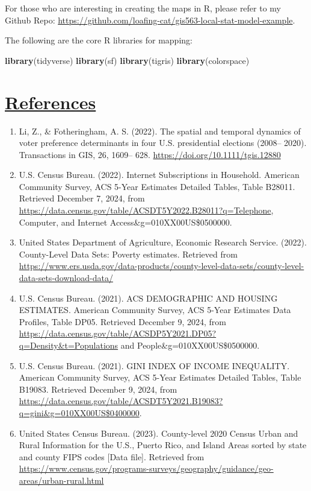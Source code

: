 \documentclass[
]{article}
\newenvironment{Shaded}{\begin{snugshade}}{\end{snugshade}}
\newcommand{\FunctionTok}[1]{\textcolor[rgb]{0.13,0.29,0.53}{\textbf{#1}}}
\newcommand{\NormalTok}[1]{#1}
\begin{document}
For those who are interesting in creating the maps in R, please refer to
my Github Repo:
\url{https://github.com/loafing-cat/gis563-local-stat-model-example}.

The following are the core R libraries for mapping:

\begin{Shaded}
\begin{Highlighting}[]
\FunctionTok{library}\NormalTok{(tidyverse)}
\FunctionTok{library}\NormalTok{(sf)}
\FunctionTok{library}\NormalTok{(tigris)}
\FunctionTok{library}\NormalTok{(colorspace)}
\end{Highlighting}
\end{Shaded}

\newpage

\section{\texorpdfstring{\ul{References}}{References}}\label{references}

\begin{enumerate}
\def\labelenumi{\arabic{enumi}.}
\item
  Li, Z., \& Fotheringham, A. S. (2022). The spatial and temporal
  dynamics of voter preference determinants in four U.S. presidential
  elections (2008-- 2020). Transactions in GIS, 26, 1609-- 628.
  \url{https://doi.org/10.1111/tgis.12880}
\item
  U.S. Census Bureau. (2022). Internet Subscriptions in Household.
  American Community Survey, ACS 5-Year Estimates Detailed Tables, Table
  B28011. Retrieved December 7, 2024, from
  \url{https://data.census.gov/table/ACSDT5Y2022.B28011?q=Telephone},
  Computer, and Internet Access\&g=010XX00US\$0500000.
\item
  United States Department of Agriculture, Economic Research Service.
  (2022). County-Level Data Sets: Poverty estimates. Retrieved from
  \url{https://www.ers.usda.gov/data-products/county-level-data-sets/county-level-data-sets-download-data/}
\item
  U.S. Census Bureau. (2021). ACS DEMOGRAPHIC AND HOUSING ESTIMATES.
  American Community Survey, ACS 5-Year Estimates Data Profiles, Table
  DP05. Retrieved December 9, 2024, from
  \url{https://data.census.gov/table/ACSDP5Y2021.DP05?q=Density&t=Populations}
  and People\&g=010XX00US\$0500000.
\item
  U.S. Census Bureau. (2021). GINI INDEX OF INCOME INEQUALITY. American
  Community Survey, ACS 5-Year Estimates Detailed Tables, Table B19083.
  Retrieved December 9, 2024, from
  \url{https://data.census.gov/table/ACSDT5Y2021.B19083?q=gini&g=010XX00US$0400000}.
\item
  United States Census Bureau. (2023). County-level 2020 Census Urban
  and Rural Information for the U.S., Puerto Rico, and Island Areas
  sorted by state and county FIPS codes {[}Data file{]}. Retrieved from
  \url{https://www.census.gov/programs-surveys/geography/guidance/geo-areas/urban-rural.html}
\end{enumerate}
\end{document}
